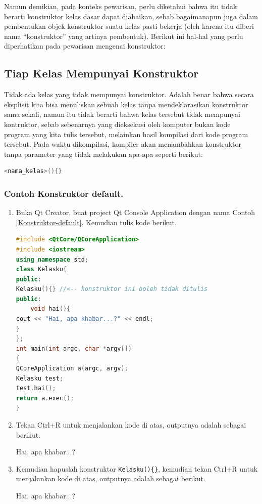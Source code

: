Namun demikian, pada konteks pewarisan, perlu diketahui bahwa itu tidak
berarti konstruktor kelas dasar dapat diabaikan, sebab bagaimanapun juga
dalam pembentukan objek konstruktor suatu kelas pasti bekerja (oleh
karena itu diberi nama ``konstruktor'' yang artinya pembentuk). Berikut
ini hal-hal yang perlu diperhatikan pada pewarisan mengenai konstruktor:

\subsection{Tiap Kelas Mempunyai
Konstruktor}\label{tiap-kelas-mempunyai-konstruktor}

Tidak ada kelas yang tidak mempunyai konstruktor. Adalah benar bahwa
secara eksplisit kita bisa menuliskan sebuah kelas tanpa mendeklarasikan
konstruktor sama sekali, namun itu tidak berarti bahwa kelas tersebut
tidak mempunyai kontruktor, sebab sebenarnya yang dieksekusi oleh
komputer bukan kode program yang kita tulis tersebut, melainkan hasil
kompilasi dari kode program tersebut. Pada waktu dikompilasi, kompiler
akan menambahkan konstruktor tanpa parameter yang tidak melakukan
apa-apa seperti berikut:

\begin{lstlisting}[language=c++, numbers=none]
<nama_kelas>(){}
\end{lstlisting}

\subsubsection*{Contoh  Konstruktor default.}

\begin{enumerate}
\def\labelenumi{\arabic{enumi}.}
\item
  Buka Qt Creator, buat project Qt Console Application dengan nama
  Contoh \ref{Konstruktor-default}. Kemudian tulis kode berikut.

\begin{lstlisting}[language=c++, caption=Konstruktor default, label=Konstruktor-default]
#include <QtCore/QCoreApplication>
#include <iostream>
using namespace std;
class Kelasku{
public:
Kelasku(){} //<-- konstruktor ini boleh tidak ditulis
public:
    void hai(){
cout << "Hai, apa khabar...?" << endl;
}
};
int main(int argc, char *argv[])
{
QCoreApplication a(argc, argv);
Kelasku test;
test.hai();
return a.exec();
}
\end{lstlisting}
\item
  Tekan Ctrl+R untuk menjalankan kode di atas, outputnya adalah sebagai
  berikut.

\begin{lcverbatim}
 Hai, apa khabar...?
\end{lcverbatim}



\item
  Kemudian hapuslah konstruktor \texttt{Kelasku()\{\}}, kemudian tekan
  Ctrl+R untuk menjalankan kode di atas, outputnya adalah sebagai
  berikut.
  \begin{lcverbatim}
  Hai, apa khabar...?
  \end{lcverbatim}
\end{enumerate}



